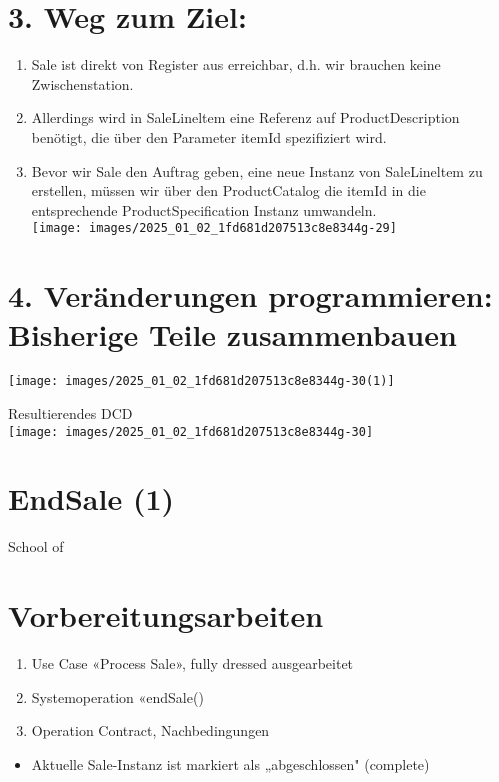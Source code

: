 \documentclass[10pt]{article}
\begin{document}
\section*{3. Weg zum Ziel:}
\begin{enumerate}
  \item Sale ist direkt von Register aus erreichbar, d.h. wir brauchen keine Zwischenstation.
  \item Allerdings wird in SaleLineltem eine Referenz auf ProductDescription benötigt, die über den Parameter itemId spezifiziert wird.
  \item Bevor wir Sale den Auftrag geben, eine neue Instanz von SaleLineltem zu erstellen, müssen wir über den ProductCatalog die itemId in die entsprechende ProductSpecification Instanz umwandeln.\\
\texttt{[image: images/2025\_01\_02\_1fd681d207513c8e8344g-29]}
\end{enumerate}

\section*{4. Veränderungen programmieren: Bisherige Teile zusammenbauen}
\begin{center}
\texttt{[image: images/2025\_01\_02\_1fd681d207513c8e8344g-30(1)]}
\end{center}

Resultierendes DCD\\
\texttt{[image: images/2025\_01\_02\_1fd681d207513c8e8344g-30]}

\section*{EndSale (1)}
School of

\section*{Vorbereitungsarbeiten}
\begin{enumerate}
  \item Use Case «Process Sale», fully dressed ausgearbeitet
  \item Systemoperation «endSale()
  \item Operation Contract, Nachbedingungen
\end{enumerate}

\begin{itemize}
  \item Aktuelle Sale-Instanz ist markiert als „abgeschlossen" (complete)
\end{itemize}
\end{document}
